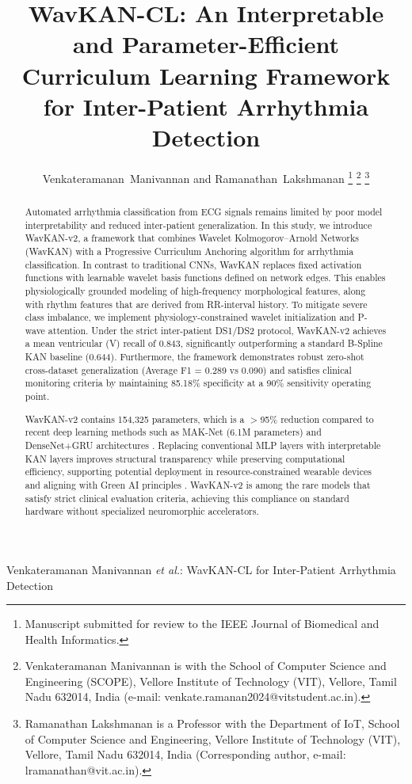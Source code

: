 \documentclass[journal,twoside,web]{ieeecolor}
\begin{document}
\title{\vspace{15mm}WavKAN-CL: An Interpretable and Parameter-Efficient Curriculum Learning Framework for Inter-Patient Arrhythmia Detection}

\author{Venkateramanan~Manivannan and Ramanathan~Lakshmanan
\thanks{Manuscript submitted for review to the IEEE Journal of Biomedical and Health Informatics.}
\thanks{Venkateramanan Manivannan is with the School of Computer Science
and Engineering (SCOPE), Vellore Institute of Technology (VIT), Vellore,
Tamil Nadu 632014, India (e-mail: venkate.ramanan2024@vitstudent.ac.in).}
\thanks{Ramanathan Lakshmanan is a Professor with the Department of IoT,
School of Computer Science and Engineering, Vellore Institute of Technology (VIT), Vellore,
Tamil Nadu 632014, India (Corresponding author, e-mail: lramanathan@vit.ac.in).}}

{Venkateramanan Manivannan \MakeLowercase{\textit{et al.}}: WavKAN-CL for Inter-Patient Arrhythmia Detection}

\maketitle

\begin{abstract}
Automated arrhythmia classification from ECG signals remains limited by poor model interpretability and reduced inter-patient generalization. In this study, we introduce WavKAN-v2, a framework that combines Wavelet Kolmogorov--Arnold Networks (WavKAN) with a Progressive Curriculum Anchoring algorithm for arrhythmia classification. In contrast to traditional CNNs, WavKAN replaces fixed activation functions with learnable wavelet basis functions defined on network edges. This enables physiologically grounded modeling of high-frequency morphological features, along with rhythm features that are derived from RR-interval history. To mitigate severe class imbalance, we implement physiology-constrained wavelet initialization and P-wave attention. Under the strict inter-patient DS1/DS2 protocol, WavKAN-v2 achieves a mean ventricular (V) recall of $0.843$, significantly outperforming a standard B-Spline KAN baseline ($0.644$). Furthermore, the framework demonstrates robust zero-shot cross-dataset generalization (Average F1 = 0.289 vs 0.090) and satisfies clinical monitoring criteria by maintaining 85.18\% specificity at a 90\% sensitivity operating point.

WavKAN-v2 contains 154,325 parameters, which is a $>$95\% reduction compared to recent deep learning methods such as MAK-Net (6.1M parameters) \cite{zhao_mak-net_2025} and DenseNet+GRU architectures \cite{guo_inter-patient_2019}. Replacing conventional MLP layers with interpretable KAN layers improves structural transparency while preserving computational efficiency, supporting potential deployment in resource-constrained wearable devices and aligning with Green AI principles \cite{farag_tiny_2023}. WavKAN-v2 is among the rare models that satisfy strict clinical evaluation criteria, achieving this compliance on standard hardware without specialized neuromorphic accelerators.
\end{abstract}
\end{document}
